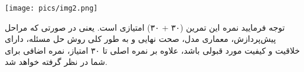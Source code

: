\begin{center}
	\texttt{[image: pics/img2.png]}
	\label{تصاویر پوشه selected_images}
\end{center}


توجه فرمایید نمره این تمرین (۳۰ + ۳۰) امتیازی است. یعنی در صورتی که مراحل پیش‌پردازش، معماری مدل، صحت نهایی و به طور کلی روش حل مسئله، دارای خلاقیت و کیفیت مورد قبولی باشد، علاوه بر نمره اصلی تا ۳۰ امتیاز، نمره اضافی برای شما در نظر گرفته خواهد شد.




\begin{qsolve}

\end{qsolve}